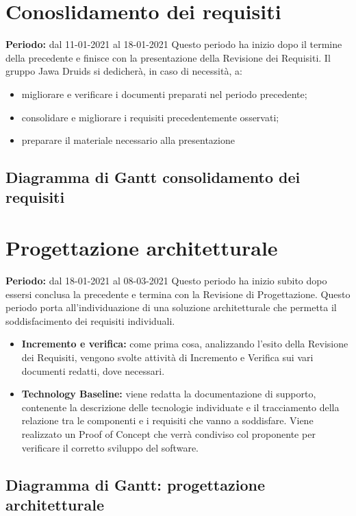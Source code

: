 \section{Conoslidamento dei requisiti}\label{4.2}
\textbf{Periodo:} dal 11-01-2021 al 18-01-2021
Questo periodo ha inizio dopo il termine della precedente e finisce con la presentazione della Revisione dei Requisiti.
Il gruppo Jawa Druids si dedicherà, in caso di necessità, a:
\begin{itemize}
	\item migliorare e verificare i documenti preparati nel periodo precedente;
	\item consolidare e migliorare i requisiti precedentemente osservati;
	\item preparare il materiale necessario alla presentazione
\end{itemize}
\subsection{Diagramma di Gantt consolidamento dei requisiti}\label{4.2.1}

\section{Progettazione architetturale}\label{4.3}
\textbf{Periodo:} dal 18-01-2021 al 08-03-2021
Questo periodo ha inizio subito dopo essersi conclusa la precedente e termina con la Revisione di Progettazione.
Questo periodo porta all'individuazione di una soluzione architetturale che permetta il soddisfacimento dei requisiti individuali.
\begin{itemize}
	\item \textbf{Incremento e verifica:} come prima cosa, analizzando l'esito della Revisione dei Requisiti, vengono svolte attività di Incremento e Verifica sui vari documenti redatti, dove necessari.
	\item \textbf{Technology Baseline:} viene redatta la documentazione di supporto, contenente la descrizione delle tecnologie individuate e il tracciamento della relazione tra le componenti e i requisiti che vanno a soddisfare.
	Viene realizzato un Proof of Concept che verrà condiviso col proponente per verificare il corretto sviluppo del software.
\end{itemize}
\subsection{Diagramma di Gantt: progettazione architetturale}\label{4.3.1}

